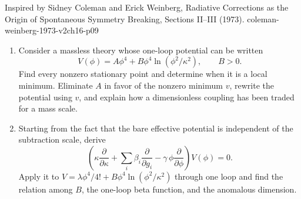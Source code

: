 \begin{enumerate}
  {Inspired by Sidney Coleman and Erick Weinberg, Radiative Corrections as the Origin of Spontaneous Symmetry Breaking, Sections II--III (1973).}
  {coleman-weinberg-1973-v2ch16-p09}
  \begin{enumerate}
    \item[(a)]
    Consider a massless theory whose one-loop potential can be written
    \[
      V(\phi)=A\phi^4+B\phi^4\ln(\phi^2/\kappa^2),
      \qquad B>0.
    \]
    Find every nonzero stationary point and determine when it is a local
    minimum.  Eliminate \(A\) in favor of the nonzero minimum \(v\), rewrite
    the potential using \(v\), and explain how a dimensionless coupling has
    been traded for a mass scale.
    \item[(b)]
    Starting from the fact that the bare effective potential is independent
    of the subtraction scale, derive
    \[
      \left(\kappa\frac{\partial}{\partial\kappa}
        +\sum_i\beta_i\frac{\partial}{\partial g_i}
        -\gamma\,\phi\frac{\partial}{\partial\phi}\right)V(\phi)=0.
    \]
    Apply it to
    \(V=\lambda\phi^4/4!+B\phi^4\ln(\phi^2/\kappa^2)\) through one loop and
    find the relation among \(B\), the one-loop beta function, and the
    anomalous dimension.
  \end{enumerate}


\end{enumerate}
